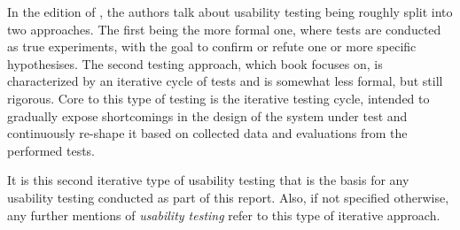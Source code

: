   In the \citeyear{citeHandbookUsability} edition of
  \cite[p. 19]{citeHandbookUsability}, the
  authors talk about usability testing being roughly split into two approaches.
  The first being the more formal one, where tests are conducted as true
  experiments, with the goal to confirm or refute one or more specific
  hypothesises. The second testing approach, which book focuses on, is
  characterized by an iterative cycle of tests and is somewhat less formal, but
  still rigorous. Core to this type of testing is the iterative testing cycle,
  intended to gradually expose shortcomings in the design of the system under
  test and continuously re-shape it based on collected data and evaluations
  from the performed tests.

  It is this second iterative type of usability testing that is the basis for
  any usability testing conducted as part of this report. Also, if not
  specified otherwise, any further mentions of \textit{usability testing}
  refer to this type of iterative approach.
